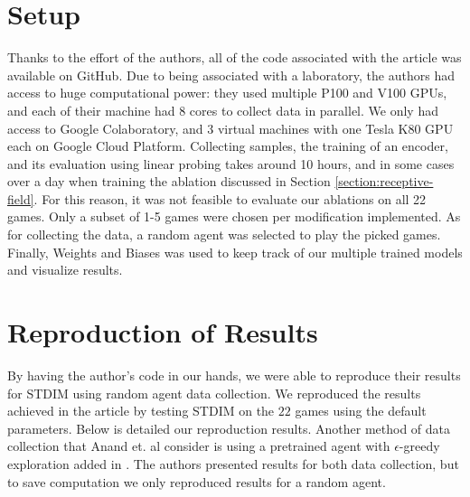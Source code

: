 \section{Setup}
Thanks to the effort of the authors, all of the code associated with the article was available on GitHub. Due to being associated with a laboratory, the authors had access to huge computational power: they used multiple P100 and V100 GPUs, and each of their machine had 8 cores to collect data in parallel. We only had access to Google Colaboratory, and 3 virtual machines with one Tesla K80 GPU each on Google Cloud Platform. Collecting samples, the training of an encoder, and its evaluation using linear probing takes around 10 hours, and in some cases over a day when training the ablation discussed in Section \ref{section:receptive-field}. For this reason, it was not feasible to evaluate our ablations on all 22 games. Only a subset of 1-5 games were chosen per modification implemented. As for collecting the data, a random agent was selected to play the picked games. Finally, Weights and Biases was used to keep track of our multiple trained models and visualize results.

\section{Reproduction of Results}
By having the author's code in our hands, we were able to reproduce their results for STDIM using random agent data collection. We reproduced the results achieved in the article by testing STDIM on the $22$ games using the default parameters. Below is detailed our reproduction results. Another method of data collection that Anand et. al consider is using a pretrained agent with $\epsilon$-greedy exploration added in \cite{main_article}. The authors presented results for both data collection, but to save computation we only reproduced results for a random agent.

